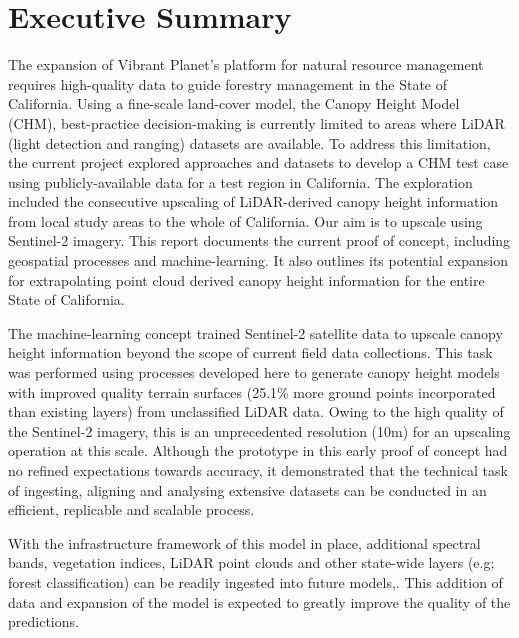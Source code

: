 \section*{Executive Summary}

The expansion of Vibrant Planet's platform for natural resource management requires high-quality data to guide forestry management in the State of California. Using a fine-scale land-cover model, the Canopy Height Model (CHM), best-practice decision-making is currently limited to areas where LiDAR (light detection and ranging) datasets are available.
To address this limitation, the current project explored approaches and datasets to develop a CHM test case using publicly-available data for a test region
in California.  The exploration included the consecutive upscaling of LiDAR-derived canopy height information from local study areas to the whole of California. Our aim is to upscale using Sentinel-2 imagery. This report documents the current
 proof of concept, including geospatial processes and machine-learning. It also outlines its potential expansion for extrapolating point cloud derived canopy height information for the entire State of California.

 The machine-learning concept trained Sentinel-2 satellite data to upscale canopy height information beyond the
 scope of current field data collections. This task was performed using processes developed here to generate
 canopy height models with improved quality terrain surfaces (25.1\% more ground points incorporated than existing layers) from unclassified LiDAR data. Owing to the high quality
 of the Sentinel-2 imagery, this is an unprecedented resolution (10m) for an upscaling operation at this scale.
Although the prototype in this early proof of concept had no refined expectations towards accuracy, it demonstrated that the technical
task of ingesting, aligning and analysing extensive datasets can be conducted in an efficient, replicable and scalable process.

With the infrastructure framework of this model in place, additional spectral bands, vegetation indices, LiDAR point clouds and other state-wide layers
(e.g; forest classification) can be readily ingested into future models,. This addition of data and expansion of the model is
expected to greatly improve the quality of the predictions.

%
